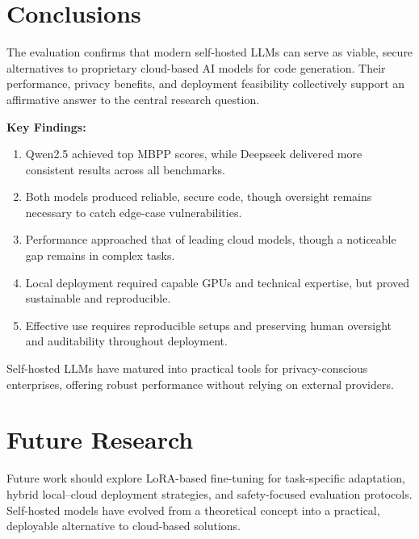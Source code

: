 \documentclass[a0,portrait,english]{hogent-poster}
\begin{document}
\begin{multicols}{2}
	\section{Conclusions}
	The evaluation confirms that modern self-hosted LLMs can serve as viable, secure alternatives to proprietary cloud-based AI models for code generation. Their performance, privacy benefits, and deployment feasibility collectively support an affirmative answer to the central research question.

	\textbf{Key Findings:}
	\begin{enumerate}[label=SQ\arabic*., ref=SQ\arabic*]
		\item Qwen2.5 achieved top MBPP scores, while Deepseek delivered more consistent results across all benchmarks.
		\item Both models produced reliable, secure code, though oversight remains necessary to catch edge-case vulnerabilities.
		\item Performance approached that of leading cloud models, though a noticeable gap remains in complex tasks.
		\item Local deployment required capable GPUs and technical expertise, but proved sustainable and reproducible.
		\item Effective use requires reproducible setups and preserving human oversight and auditability throughout deployment.
	\end{enumerate}

	Self-hosted LLMs have matured into practical tools for privacy-conscious enterprises, offering robust performance without relying on external providers.

	\section{Future Research}
	Future work should explore LoRA-based fine-tuning for task-specific adaptation, hybrid local–cloud deployment strategies, and safety-focused evaluation protocols. Self-hosted models have evolved from a theoretical concept into a practical, deployable alternative to cloud-based solutions.

\end{multicols}
\end{document}
